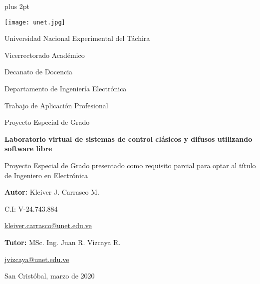 \begin{titlepage}
	\parskip=7.25pt plus 2pt
	\setcounter{page}{2}
	\begin{center}
		\texttt{[image: unet.jpg]}
		
		Universidad Nacional Experimental del Táchira 
		
		Vicerrectorado Académico
		
		Decanato de Docencia
		
		Departamento de Ingeniería Electrónica
		
		Trabajo de Aplicación Profesional
		
		Proyecto Especial de Grado
	\end{center}

	\centering
	\vspace{2cm}
	\vfill
	{\Large \textbf{Laboratorio virtual de sistemas de control clásicos y difusos utilizando software libre}\par}
	\vspace{10pt}
	{\large Proyecto Especial de Grado presentado como requisito parcial para optar al título de Ingeniero en Electrónica}

	\vfill
	\begin{flushright}
		\begin{spacing}{1.5}
			\textbf{Autor:} Kleiver J. Carrasco M.
			
			C.I: V-24.743.884
			
			\href{kleiver.carrasco@unet.edu.ve}{kleiver.carrasco@unet.edu.ve}
			
			\textbf{Tutor:} MSc. Ing. Juan R. Vizcaya R.
			
			\href{jvizcaya@unet.edu.ve}{jvizcaya@unet.edu.ve}
		\end{spacing}	
	\end{flushright}

	\vfill
		San Cristóbal, marzo de 2020
	\leavevmode
\end{titlepage}